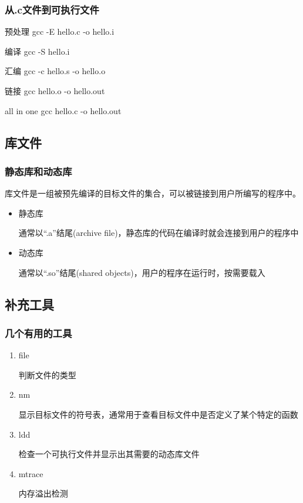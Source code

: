 \documentclass{beamer}
\begin{document}
\begin{frame}
\frametitle{从.c文件到可执行文件}
\begin{block}{预处理}
gcc -E hello.c -o hello.i
\end{block}

\begin{block}{编译}
gcc -S hello.i

\end{block}

\begin{block}{汇编}
gcc -c hello.s -o hello.o

\end{block}
\begin{block}{链接}
gcc hello.o -o hello.out
\end{block}

\begin{block}{all in one}
gcc hello.c -o hello.out
\end{block}
\end{frame}

\subsection{库文件}
\begin{frame}
\frametitle{静态库和动态库}
库文件是一组被预先编译的目标文件的集合，可以被链接到用户所编写的程序中。
\begin{itemize}
\item 静态库

通常以“.a”结尾(archive file)，静态库的代码在编译时就会连接到用户的程序中
\item 动态库

通常以“.so”结尾(shared objects)，用户的程序在运行时，按需要载入
\end{itemize}

\end{frame}
\subsection{补充工具}
\begin{frame}
\frametitle{几个有用的工具}
\begin{enumerate}
\item file

判断文件的类型
\item nm

显示目标文件的符号表，通常用于查看目标文件中是否定义了某个特定的函数

\item ldd

检查一个可执行文件并显示出其需要的动态库文件

\item
mtrace

内存溢出检测

\end{enumerate}
\end{frame}
\end{document}
